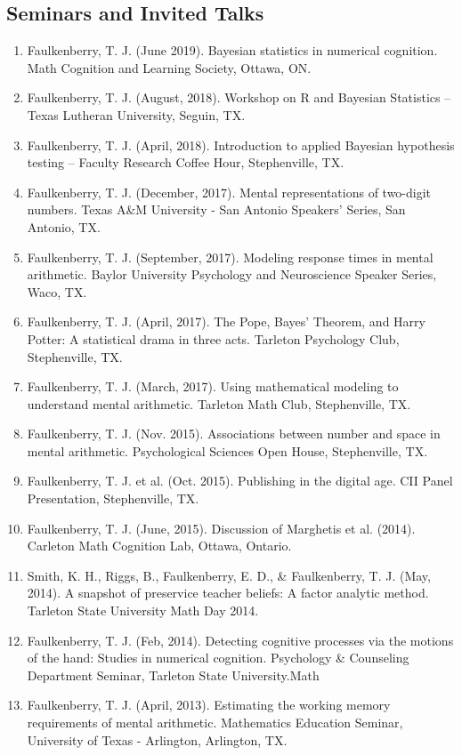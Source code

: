 \documentclass[article,10pt]{article}
\begin{document}
\subsection*{Seminars and Invited Talks}
\label{sec:org4177e42}
\begin{enumerate}
\item Faulkenberry, T. J. (June 2019). Bayesian statistics in numerical cognition. Math Cognition and Learning Society, Ottawa, ON.
\item Faulkenberry, T. J. (August, 2018). Workshop on R and Bayesian Statistics -- Texas Lutheran University, Seguin, TX.
\item Faulkenberry, T. J. (April, 2018). Introduction to applied Bayesian hypothesis testing -- Faculty Research Coffee Hour, Stephenville, TX.
\item Faulkenberry, T. J. (December, 2017). Mental representations of two-digit numbers. Texas A\&M University - San Antonio Speakers' Series, San Antonio, TX.
\item Faulkenberry, T. J. (September, 2017). Modeling response times in mental arithmetic. Baylor University Psychology and Neuroscience Speaker Series, Waco, TX.
\item Faulkenberry, T. J. (April, 2017). The Pope, Bayes' Theorem, and Harry Potter: A statistical drama in three acts.  Tarleton Psychology Club, Stephenville, TX.
\item Faulkenberry, T. J. (March, 2017). Using mathematical modeling to understand mental arithmetic. Tarleton Math Club, Stephenville, TX.
\item Faulkenberry, T. J. (Nov. 2015). Associations between number and space in mental arithmetic.  Psychological Sciences Open House, Stephenville, TX.
\item Faulkenberry, T. J. et al. (Oct. 2015). Publishing in the digital age.  CII Panel Presentation, Stephenville, TX.
\item Faulkenberry, T. J. (June, 2015). Discussion of Marghetis et al. (2014). Carleton Math Cognition Lab, Ottawa, Ontario.
\item Smith, K. H., Riggs, B., Faulkenberry, E. D., \& Faulkenberry, T. J. (May, 2014). A snapshot of preservice teacher beliefs: A factor analytic method. Tarleton State University Math Day 2014.
\item Faulkenberry, T. J. (Feb, 2014). Detecting cognitive processes via the motions of the hand: Studies in numerical cognition.  Psychology \& Counseling Department Seminar, Tarleton State University.Math
\item Faulkenberry, T. J. (April, 2013). Estimating the working memory requirements of mental arithmetic. Mathematics Education Seminar, University of Texas - Arlington, Arlington, TX.

\end{enumerate}
\end{document}
